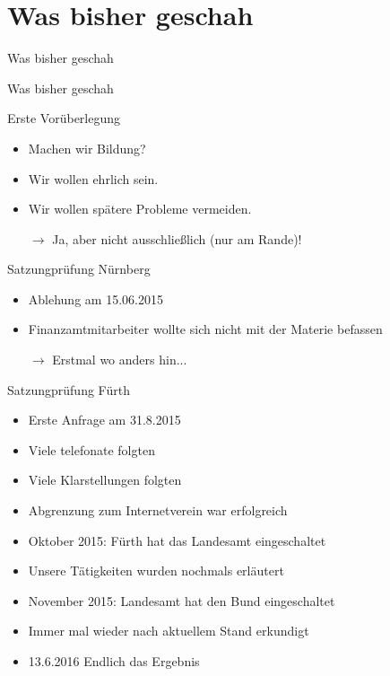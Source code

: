 \section*{Was bisher geschah}
\begin{frame}{Was bisher geschah}
    \begin{center}
        Was bisher geschah
    \end{center}
\end{frame}

\begin{frame}{Erste Vorüberlegung}
    \begin{itemize}
        \item Machen wir Bildung?
        \item Wir wollen ehrlich sein.
        \item Wir wollen spätere Probleme vermeiden.
        \item[$\rightarrow$] Ja, aber nicht ausschließlich (nur am Rande)!
    \end{itemize}
\end{frame}

\begin{frame}{Satzungprüfung Nürnberg}
    \begin{itemize}
        \item Ablehung am 15.06.2015
        \item Finanzamtmitarbeiter wollte sich nicht mit der Materie befassen
        \item[$\rightarrow$] Erstmal wo anders hin...
    \end{itemize}
\end{frame}

\begin{frame}{Satzungprüfung Fürth}
    \begin{itemize}
        \item Erste Anfrage am 31.8.2015
        \item Viele telefonate folgten
        \item Viele Klarstellungen folgten
        \item Abgrenzung zum Internetverein war erfolgreich
        \item Oktober 2015: Fürth hat das Landesamt eingeschaltet
        \item Unsere Tätigkeiten wurden nochmals erläutert
        \item November 2015: Landesamt hat den Bund eingeschaltet
        \item Immer mal wieder nach aktuellem Stand erkundigt
        \item 13.6.2016 Endlich das Ergebnis
    \end{itemize}
\end{frame}

